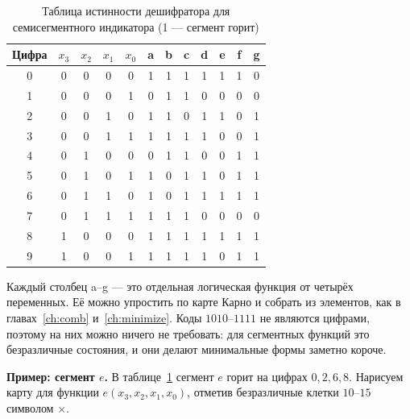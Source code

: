 \begin{table}[H]
\centering
\caption{Таблица истинности дешифратора для семисегментного индикатора (1 --- сегмент горит)}
\label{tab:7seg}
\small
\begin{tabular}{c|cccc|ccccccc}
\toprule
Цифра & $x_3$ & $x_2$ & $x_1$ & $x_0$ & a & b & c & d & e & f & g \\
\midrule
0 & 0&0&0&0 & 1&1&1&1&1&1&0 \\
1 & 0&0&0&1 & 0&1&1&0&0&0&0 \\
2 & 0&0&1&0 & 1&1&0&1&1&0&1 \\
3 & 0&0&1&1 & 1&1&1&1&0&0&1 \\
4 & 0&1&0&0 & 0&1&1&0&0&1&1 \\
5 & 0&1&0&1 & 1&0&1&1&0&1&1 \\
6 & 0&1&1&0 & 1&0&1&1&1&1&1 \\
7 & 0&1&1&1 & 1&1&1&0&0&0&0 \\
8 & 1&0&0&0 & 1&1&1&1&1&1&1 \\
9 & 1&0&0&1 & 1&1&1&1&0&1&1 \\
\bottomrule
\end{tabular}
\end{table}

Каждый столбец a--g --- это отдельная логическая функция от четырёх
переменных. Её можно упростить по карте Карно и собрать из элементов, как в
главах~\ref{ch:comb} и~\ref{ch:minimize}. Коды $1010$--$1111$ не
являются цифрами, поэтому на них можно ничего не требовать: для
сегментных функций это безразличные состояния, и они делают
минимальные формы заметно короче.

\textbf{Пример: сегмент $e$.} В таблице~\ref{tab:7seg} сегмент $e$ горит на
цифрах $0,2,6,8$. Нарисуем карту для функции $e(x_3,x_2,x_1,x_0)$,
отметив безразличные клетки $10$--$15$ символом $\times$.

